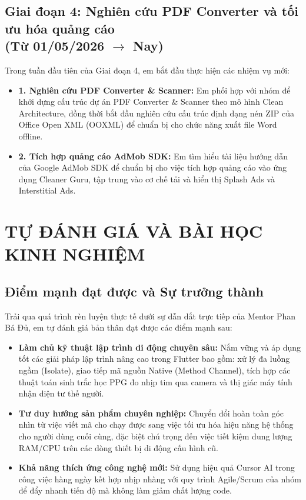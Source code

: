 \documentclass[12pt, a4paper]{article}
\begin{document}
\subsection[Giai đoạn 4: Nghiên cứu PDF Converter và tối ưu hóa quảng cáo (Từ 01/05/2026 đến nay)]{Giai đoạn 4: Nghiên cứu PDF Converter và tối ưu hóa quảng cáo \\(Từ 01/05/2026 $\rightarrow$ Nay)}
Trong tuần đầu tiên của Giai đoạn 4, em bắt đầu thực hiện các nhiệm vụ mới:
\begin{itemize}
    \item \textbf{1. Nghiên cứu PDF Converter \& Scanner:} Em phối hợp với nhóm để khởi dựng cấu trúc dự án PDF Converter \& Scanner theo mô hình Clean Architecture, đồng thời bắt đầu nghiên cứu cấu trúc định dạng nén ZIP của Office Open XML (OOXML) để chuẩn bị cho chức năng xuất file Word offline.
    \item \textbf{2. Tích hợp quảng cáo AdMob SDK:} Em tìm hiểu tài liệu hướng dẫn của Google AdMob SDK để chuẩn bị cho việc tích hợp quảng cáo vào ứng dụng Cleaner Guru, tập trung vào cơ chế tải và hiển thị Splash Ads và Interstitial Ads.
\end{itemize}

\section{TỰ ĐÁNH GIÁ VÀ BÀI HỌC KINH NGHIỆM}

\subsection{Điểm mạnh đạt được và Sự trưởng thành}
Trải qua quá trình rèn luyện thực tế dưới sự dẫn dắt trực tiếp của Mentor Phan Bá Đủ, em tự đánh giá bản thân đạt được các điểm mạnh sau:
\begin{itemize}
    \item \textbf{Làm chủ kỹ thuật lập trình di động chuyên sâu:} Nắm vững và áp dụng tốt các giải pháp lập trình nâng cao trong Flutter bao gồm: xử lý đa luồng ngầm (Isolate), giao tiếp mã nguồn Native (Method Channel), tích hợp các thuật toán sinh trắc học PPG đo nhịp tim qua camera và thị giác máy tính nhận diện tư thế người.
    \item \textbf{Tư duy hướng sản phẩm chuyên nghiệp:} Chuyển đổi hoàn toàn góc nhìn từ việc viết mã cho chạy được sang việc tối ưu hóa hiệu năng hệ thống cho người dùng cuối cùng, đặc biệt chú trọng đến việc tiết kiệm dung lượng RAM/CPU trên các dòng thiết bị di động cấu hình cũ.
    \item \textbf{Khả năng thích ứng công nghệ mới:} Sử dụng hiệu quả Cursor AI trong công việc hàng ngày kết hợp nhịp nhàng với quy trình Agile/Scrum của nhóm để đẩy nhanh tiến độ mà không làm giảm chất lượng code.
\end{itemize}
\end{document}
